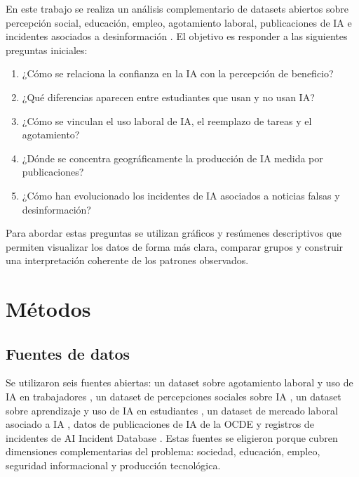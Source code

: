 \documentclass{llncs}
\begin{document}
En este trabajo se realiza un análisis complementario de datasets abiertos sobre percepción social, educación, empleo, agotamiento laboral, publicaciones de IA e incidentes asociados a desinformación \cite{keskin2026,mazari2026,uom2026,justin2026,oecd2026,aiid2026}. El objetivo es responder a las siguientes preguntas iniciales:
\begin{enumerate}
    \item ¿Cómo se relaciona la confianza en la IA con la percepción de beneficio?
    \item ¿Qué diferencias aparecen entre estudiantes que usan y no usan IA?
    \item ¿Cómo se vinculan el uso laboral de IA, el reemplazo de tareas y el agotamiento?
    \item ¿Dónde se concentra geográficamente la producción de IA medida por publicaciones?
    \item ¿Cómo han evolucionado los incidentes de IA asociados a noticias falsas y desinformación?
\end{enumerate}

Para abordar estas preguntas se utilizan gráficos y resúmenes descriptivos que permiten visualizar los datos de forma más clara, comparar grupos y construir una interpretación coherente de los patrones observados.

\newpage
\section{Métodos}
\subsection{Fuentes de datos}
Se utilizaron seis fuentes abiertas: un dataset sobre agotamiento laboral y uso de IA en trabajadores \cite{justin2026}, un dataset de percepciones sociales sobre IA \cite{keskin2026}, un dataset sobre aprendizaje y uso de IA en estudiantes \cite{mazari2026}, un dataset de mercado laboral asociado a IA \cite{uom2026}, datos de publicaciones de IA de la OCDE \cite{oecd2026} y registros de incidentes de AI Incident Database \cite{aiid2026}. Estas fuentes se eligieron porque cubren dimensiones complementarias del problema: sociedad, educación, empleo, seguridad informacional y producción tecnológica.
\end{document}
